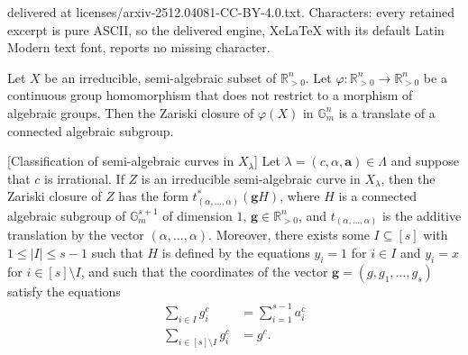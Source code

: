 \documentclass[10pt,a4paper]{amsart}
\newcommand{\G}{\mathbb{G}}
\newcommand{\R}{\mathbb{R}}
\renewcommand{\phi}{\varphi}
\renewcommand{\vec}[1]{\bm{#1}}
\begin{document}
delivered at licenses/arxiv-2512.04081-CC-BY-4.0.txt. Characters: every retained excerpt is pure ASCII, so the delivered engine, XeLaTeX with its default Latin Modern text font, reports no missing character.
\begin{theorem}
\label{functional_transcendence_theorem}
    Let $X$ be an irreducible, semi-algebraic subset of $\R_{>0}^n$. Let $\phi : \R_{>0}^n \to \R_{>0}^n$ be a continuous group homomorphism that does not restrict to a morphism of algebraic groups. Then the Zariski closure of $\phi(X)$ in $\G_m^n$ is a translate of a connected algebraic subgroup.
\end{theorem}

\begin{lemma}
\label{lemma/classification_of_semi-algebraic_curves}
    [Classification of semi-algebraic curves in $X_\lambda$]
    Let $\lambda = (c, \alpha, \vec{a}) \in \Lambda$ and suppose that $c$ is irrational. If $Z$ is an irreducible semi-algebraic curve in $X_\lambda$, then the Zariski closure of $Z$ has the form $t_{(\alpha, \dots, \alpha)}^*(\vec{g} H)$, where $H$ is a connected algebraic subgroup of $\G_m^{s + 1}$ of dimension $1$, $\vec{g} \in \R_{>0}^n$, and $t_{(\alpha, \dots, \alpha)}$ is the additive translation by the vector $(\alpha, \dots, \alpha)$. Moreover, there exists some $I \subseteq [s]$ with $1 \leq |I| \leq s - 1$ such that $H$ is defined by the equations $y_i = 1$ for $i \in I$ and $y_i = x$ for $i \in [s] \setminus I$, and such that the coordinates of the vector $\vec{g} = (g, g_1, \dots, g_s)$ satisfy the equations
    \begin{align*}
        \sum_{i \in I} g_i^c &= \sum_{i = 1}^{s - 1} a_i^c
        \\
        \sum_{i \in [s] \setminus I}
        g_i^c &= g^c.
    \end{align*}
\end{lemma}
\end{document}
